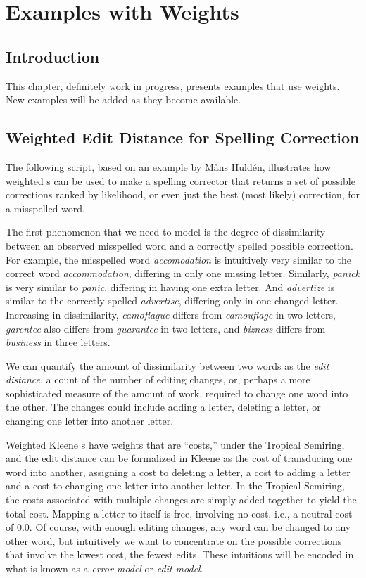 \chapter{Examples with Weights}

\label{chapt:exampleswithweights}

\section{Introduction}

This chapter, definitely work in progress, presents examples that
use weights.  New examples will be added as they become available.

\section{Weighted Edit Distance for Spelling Correction}

The following script, based on an example by M\r{a}ns Huldén, illustrates how weighted \fst{}s
can be used to make a spelling corrector that returns a set of possible
corrections ranked by likelihood, or even just the best (most likely)
correction, for a misspelled word.

The first phenomenon that we need to model is the degree of dissimilarity between an
observed misspelled word and a correctly spelled possible correction.  For example, the misspelled
word \emph{accomodation} is intuitively very similar to the correct word
\emph{accommodation}, differing in only one missing letter.  Similarly,
\emph{panick}
is very similar to \emph{panic}, differing in having one extra letter.  And
\emph{advertize} is similar to the correctly spelled \emph{advertise}, differing only
in one changed letter. Increasing in dissimilarity, \emph{camoflague} differs from
\emph{camouflage} in two letters, \emph{garentee} also differs from
\emph{guarantee} in
two letters, and \emph{bizness} differs from \emph{business} in three letters.

We can quantify the amount of dissimilarity between two words as the \emph{edit distance},
a count of the number of editing changes, or, perhaps a more sophisticated measure
of the amount of work, required to change one word into the
other.  The changes could include adding a letter, deleting a letter, or changing
one letter into another letter.

Weighted Kleene \fst{}s have weights that are ``costs,'' under the Tropical Semiring, and
the edit distance can be formalized in Kleene as the cost of
transducing one word into another, assigning a cost to deleting a
letter, a cost to adding a letter and a cost to changing one letter into
another letter.  In the Tropical Semiring, the costs associated with multiple changes are simply
added together to yield the total cost.  Mapping a letter to itself is free, involving no cost,
i.e., a neutral cost of 0.0.  Of
course, with
enough editing changes, any word can be changed to any other word,
but intuitively we want to concentrate on the possible corrections that
involve the lowest cost, the fewest edits.  These intuitions will be encoded in what is known 
as a \emph{error model} or \emph{edit model}.

